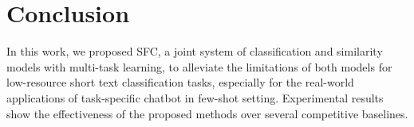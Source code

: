 \section{Conclusion}
\label{sec:conclusion}

In  this  work,  we proposed SFC, a joint system of classification and  similarity  models with multi-task learning, 
to  alleviate  the  limitations  of  both models   for  low-resource  short text  classification  tasks, 
especially for the real-world applications of task-specific chatbot in few-shot setting.  
Experimental  results show the effectiveness of the proposed methods 
over several competitive baselines.
